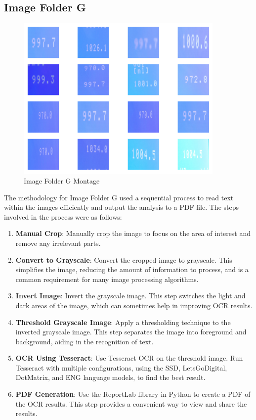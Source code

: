 \newpage

\subsection{Image Folder G}

\begin{figure}[ht]
    \centering
    \includegraphics[width=0.9\textwidth]{Figures/EDA_Charts/9/montage.png}
    \caption[Image Folder G Montage]{Image Folder G Montage}
    \label{fig:Image Folder G Montage}
\end{figure}

The methodology for Image Folder G used a sequential process to read text within the images efficiently and output the analysis to a PDF file. The steps involved in the process were as follows:

\begin{enumerate}
    \item \textbf{Manual Crop}: Manually crop the image to focus on the area of interest and remove any irrelevant parts.
    \item \textbf{Convert to Grayscale}: Convert the cropped image to grayscale. This simplifies the image, reducing the amount of information to process, and is a common requirement for many image processing algorithms.
    \item \textbf{Invert Image}: Invert the grayscale image. This step switches the light and dark areas of the image, which can sometimes help in improving OCR results.
    \item \textbf{Threshold Grayscale Image}: Apply a thresholding technique to the inverted grayscale image. This step separates the image into foreground and background, aiding in the recognition of text.
    \item \textbf{OCR Using Tesseract}: Use Tesseract OCR on the threshold image. Run Tesseract with multiple configurations, using the SSD, LetsGoDigital, DotMatrix, and ENG language models, to find the best result.
    \item \textbf{PDF Generation}: Use the ReportLab library in Python to create a PDF of the OCR results. This step provides a convenient way to view and share the results.
\end{enumerate}

